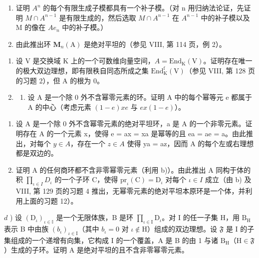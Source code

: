 \begin{enumerate}
\def\labelenumi{\alph{enumi})}
\item
  证明 \(A^{n}\) 的每个有限生成子模都具有一个补子模。（对 n 用归纳法论证，先证明 \(M \cap A^{n-1}\) 是有限生成的，然后选取 \(M \cap A^{n-1}\) 在 \(A^{n-1}\) 中的补子模以及 M 的像在 \(Ae_{n}\) 中的补子模。）
\item
  由此推出环 \(\mathbf{M}_n(\mathrm{A})\) 是绝对平坦的（参见 VIII, 第 114 页，例 2）。
\end{enumerate}

\begin{enumerate}
\def\labelenumi{\arabic{enumi})}
\setcounter{enumi}{28}
\item
  设 V 是交换域 K 上的一个可数维向量空间，\(A = \text{End}_{\text{K}}(\text{V})\)。证明存在唯一的极大双边理想，即有限秩自同态所成之集 \(\text{End}_{\text{K}}^{\text{f}}(\text{V})\)（参见 VIII, 第 128 页的习题 2），但 A 的根为 0。
\item
  \begin{enumerate}
  \def\labelenumii{\alph{enumii})}
  \tightlist
  \item
    设 A 是一个除 0 外不含幂零元素的环。证明 A 中的每个幂等元 e 都属于 A 的中心（考虑元素 \((1-e)xe\) 与 \(ex(1-e)\)）。
  \end{enumerate}
\end{enumerate}

\begin{enumerate}
\def\labelenumi{\alph{enumi})}
\setcounter{enumi}{1}
\item
  设 A 是一个除 0 外不含幂零元素的绝对平坦环，a 是 A 的一个非零元素。证明存在 A 的一个元素 x，使得 e = ax = xa 是幂等的且 ea = ae = a。由此推出，对每个 \(y \in A\)，存在一个 \(z \in A\) 使得 ya = az，因而 A 的每个左或右理想都是双边的。
\item
  证明 A 的任何商环都不含非零幂零元素（利用 b)）。由此推出 A 同构于体的积 \(\prod_{\iota\in I}D_{\iota}\) 的一个子环 C，使得 \(\mathrm{pr}_{\iota}(\mathrm{C})=\mathrm{D}_{\iota}\) 对每个 \(\iota\in I\) 成立（由 b) 及 VIII, 第 129 页的习题 4 推出，无幂零元素的绝对平坦本原环是一个体，并利用上面的习题 12）。
\end{enumerate}

\(d\) ) 设 \((\mathrm{D}_{\iota})_{\iota \in \mathbb{I}}\) 是一个无限体族，B 是环 \(\prod_{\iota \in \mathrm{I}}\mathrm{D}_{\iota}\)。对 I 的任一子集 H，用 \(\mathrm{B_H}\) 表示 B 中由族 \((b_{\iota})_{\iota \in \mathrm{I}}\)（其中 \(b_{\iota} = 0\) 对 \(\iota \notin \mathrm{H}\)）组成的双边理想。设 \(\mathfrak{F}\) 是 I 的子集组成的一个递增有向集，它构成 I 的一个覆盖，A 是 B 的由 1 与诸 \(\mathrm{B_H}\)（\(\mathrm{H}\in \mathfrak{F}\)）生成的子环。证明 A 是绝对平坦的且不含非零幂零元素。

